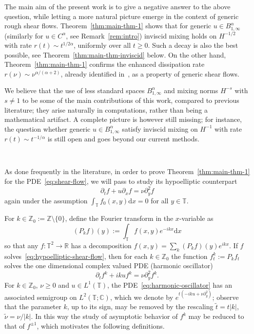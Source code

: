 \documentclass[11pt,oneside,reqno]{amsart}
\newcommand{\assign}{:=}
\newcommand{\mathd}{\mathrm{d}}
\newcommand{\tmtextbf}[1]{\text{{\bfseries{#1}}}}
\numberwithin{equation}{section}
\begin{document}
The main aim of the present work is to give a negative answer to the above
question, while letting a more natural picture emerge in the context of
generic rough shear flows. Theorem~\ref{thm:main-thm-1} shows that for generic
$u \in B^{\alpha}_{1, \infty}$ (similarly for $u \in C^{\alpha}$, see
Remark~\ref{rem:intro}) inviscid mixing holds on $H^{- 1 / 2}$ with rate $r
(t) \sim t^{1 / 2 \alpha}$, uniformly over all $t \geqslant 0$. Such a decay
is also the best possible, see Theorem~\ref{thm:main-thm-inviscid} below. On
the other hand, Theorem~\ref{thm:main-thm-1} confirms the enhanced dissipation
rate $r (\nu) \sim \nu^{\alpha / (\alpha + 2)}$, already identified
in~{\cite{wei,colombozelati}}, as a property of generic shear flows.

We believe that the use of less standard spaces $B^{\alpha}_{1, \infty}$ and
mixing norms $H^{- s}$ with $s \neq 1$ to be some of the main contributions of
this work, compared to previous literature; they arise naturally in
computations, rather than being a mathematical artifact. A complete picture is
however still missing; for instance, the question whether generic $u \in
B^{\alpha}_{1, \infty}$ satisfy inviscid mixing on $H^{- 1}$ with rate $r (t)
\sim t^{- 1 / \alpha}$ is still open and goes beyond our current methods.

\

\tmtextbf{Structure of the proof.} As done frequently in the literature, in
order to prove Theorem~\ref{thm:main-thm-1} for the PDE~\eqref{eq:shear-flow},
we will pass to study its hypoelliptic counterpart
\begin{equation}
  \partial_t f + u \partial_x f = \nu \partial_y^2 f
  \label{eq:hypoelliptic-shear-flow}
\end{equation}
again under the assumption $\int_{\mathbb{T}} f_0 (x, y) \mathd x = 0$ for all
$y \in \mathbb{T}$.

For $k \in \mathbb{Z}_0 \assign \mathbb{Z} \setminus \{ 0 \}$, define the
Fourier transform in the $x$-variable as
\[ (P_k f) (y) \assign \int_{\mathbb{T}} f (x, y) e^{- i k x} \mathd x \]
so that any $f : \mathbb{T}^2 \rightarrow \mathbb{R}$ has a decomposition $f
(x, y) = \sum_k (P_k f) (y) e^{i k x}$. If $f$
solves~\eqref{eq:hypoelliptic-shear-flow}, then for each $k \in \mathbb{Z}_0$
the function $f^k_t \assign P_k f_t$ solves the one dimensional complex valued
PDE (harmonic oscillator)
\begin{equation}
  \partial_t f^k + i k u f^k = \nu \partial_y^2 f^k .
  \label{eq:harmonic-oscillator}
\end{equation}
For $k \in \mathbb{Z}_0$, $\nu \geqslant 0$ and $u \in L^1 (\mathbb{T})$, the
PDE~\eqref{eq:harmonic-oscillator} has an associated semigroup on $L^2
(\mathbb{T}; \mathbb{C})$, which we denote by $e^{t (- i k u + \nu
\partial_y^2)}$; observe that the parameter $k$, up to its sign, may be
removed by the rescaling $\tilde{t} = t | k |$, $\tilde{\nu} = \nu / | k |$.
In this way the study of asymptotic behavior of $f^k$ may be reduced to that
of $f^{\pm 1}$, which motivates the following definitions.
\end{document}
